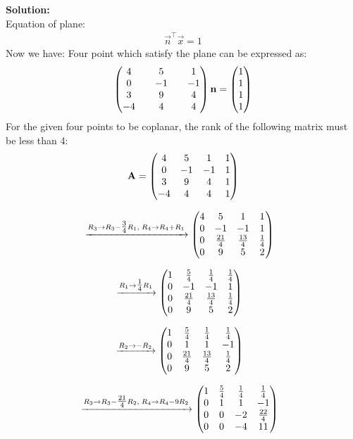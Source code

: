 \documentclass[12pt]{article}
\begin{document}
\textbf{Solution:} \\
Equation of plane:
\begin{align}
    \vec{n}^\top\vec{x}=1
\end{align}
Now we have:
Four point which satisfy the plane can be expressed as:
\begin{align}
    \begin{pmatrix}4 && 5 && 1 \\
           0 && -1 && -1 \\
           3 && 9 && 4 \\
           -4 && 4 && 4 \end{pmatrix} \mathbf{n}=\begin{pmatrix}1 \\ 1 \\ 1 \\1\end{pmatrix}      
\end{align}
For the given four points to be coplanar, the rank of the following matrix must be less than 4:
\begin{align}
\mathbf{A}=\begin{pmatrix} 
4 & 5 & 1 & 1\\
0 & -1 & -1 & 1 \\
3 & 9 & 4 & 1\\
-4 & 4 & 4 & 1 
\end{pmatrix}
\end{align}

\begin{align}
&\xrightarrow{R_3 \to R_3 - \tfrac{3}{4}R_1,\; R_4 \to R_4 + R_1}
\begin{pmatrix}
4 & 5 & 1 & 1 \\
0 & -1 & -1 & 1 \\
0 & \tfrac{21}{4} & \tfrac{13}{4} & \tfrac{1}{4} \\
0 & 9 & 5 & 2
\end{pmatrix}
\end{align}

\begin{align}
&\xrightarrow{R_1 \to \tfrac{1}{4}R_1}
\begin{pmatrix}
1 & \tfrac{5}{4} & \tfrac{1}{4} & \tfrac{1}{4} \\
0 & -1 & -1 & 1 \\
0 & \tfrac{21}{4} & \tfrac{13}{4} & \tfrac{1}{4} \\
0 & 9 & 5 & 2
\end{pmatrix}
\end{align}

\begin{align}
&\xrightarrow{R_2 \to -R_2}
\begin{pmatrix}
1 & \tfrac{5}{4} & \tfrac{1}{4} & \tfrac{1}{4} \\
0 & 1 & 1 & -1 \\
0 & \tfrac{21}{4} & \tfrac{13}{4} & \tfrac{1}{4} \\
0 & 9 & 5 & 2
\end{pmatrix}
\end{align}

\begin{align}
&\xrightarrow{R_3 \to R_3 - \tfrac{21}{4}R_2,\; R_4 \to R_4 - 9R_2}
\begin{pmatrix}
1 & \tfrac{5}{4} & \tfrac{1}{4} & \tfrac{1}{4} \\
0 & 1 & 1 & -1 \\
0 & 0 & -2 & \tfrac{22}{4} \\
0 & 0 & -4 & 11
\end{pmatrix}
\end{align}
\end{document}
